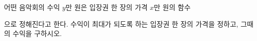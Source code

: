 어떤 음악회의 수익 $y$만 원은 입장권 한 장의 가격 $x$만 원의 함수 \par\smallskip{}\par\smallskip\noindent 으로 정해진다고 한다. 수익이 최대가 되도록 하는 입장권 한 장의 가격을 정하고, 그때의 수익을 구하시오.

